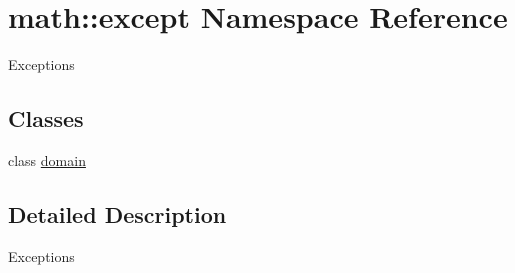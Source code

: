 \hypertarget{namespacemath_1_1except}{
\section{math::except Namespace Reference}
\label{namespacemath_1_1except}
}


Exceptions  
\subsection*{Classes}
\begin{DoxyCompactItemize}
\item 
class \hyperlink{classmath_1_1except_1_1domain}{domain}
\end{DoxyCompactItemize}


\subsection{Detailed Description}
Exceptions 